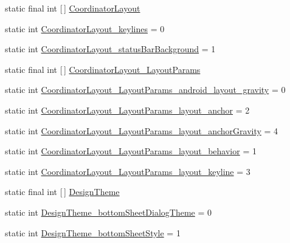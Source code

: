 \begin{DoxyCompactItemize}
\item 
static final int \mbox{[}$\,$\mbox{]} \hyperlink{classandroid_1_1support_1_1v7_1_1appcompat_1_1R_1_1styleable_a36909bd71e5ee18cc73ff4732b601a79}{Coordinator\+Layout}
\item 
static int \hyperlink{classandroid_1_1support_1_1v7_1_1appcompat_1_1R_1_1styleable_ade8ef8741049ad76bd5e90b20b187b41}{Coordinator\+Layout\+\_\+keylines} = 0
\item 
static int \hyperlink{classandroid_1_1support_1_1v7_1_1appcompat_1_1R_1_1styleable_a3cac0ac0b4683f1615bfd53649866096}{Coordinator\+Layout\+\_\+status\+Bar\+Background} = 1
\item 
static final int \mbox{[}$\,$\mbox{]} \hyperlink{classandroid_1_1support_1_1v7_1_1appcompat_1_1R_1_1styleable_aa327c121de57ab2e57c054fff5f5c980}{Coordinator\+Layout\+\_\+\+Layout\+Params}
\item 
static int \hyperlink{classandroid_1_1support_1_1v7_1_1appcompat_1_1R_1_1styleable_a2bbafef211aa759215c44685dec3bdfb}{Coordinator\+Layout\+\_\+\+Layout\+Params\+\_\+android\+\_\+layout\+\_\+gravity} = 0
\item 
static int \hyperlink{classandroid_1_1support_1_1v7_1_1appcompat_1_1R_1_1styleable_a0326fdc342fc459e0f22e865f9bafa9b}{Coordinator\+Layout\+\_\+\+Layout\+Params\+\_\+layout\+\_\+anchor} = 2
\item 
static int \hyperlink{classandroid_1_1support_1_1v7_1_1appcompat_1_1R_1_1styleable_ac5930c177fccf3156cc93d585d9e2e9c}{Coordinator\+Layout\+\_\+\+Layout\+Params\+\_\+layout\+\_\+anchor\+Gravity} = 4
\item 
static int \hyperlink{classandroid_1_1support_1_1v7_1_1appcompat_1_1R_1_1styleable_a3c5485968079da7140d1094aeaed49d7}{Coordinator\+Layout\+\_\+\+Layout\+Params\+\_\+layout\+\_\+behavior} = 1
\item 
static int \hyperlink{classandroid_1_1support_1_1v7_1_1appcompat_1_1R_1_1styleable_a71b92f33ca3d04c4ead0d908659739bf}{Coordinator\+Layout\+\_\+\+Layout\+Params\+\_\+layout\+\_\+keyline} = 3
\item 
static final int \mbox{[}$\,$\mbox{]} \hyperlink{classandroid_1_1support_1_1v7_1_1appcompat_1_1R_1_1styleable_aff3ce11bdf266828d90b9a386168c4b0}{Design\+Theme}
\item 
static int \hyperlink{classandroid_1_1support_1_1v7_1_1appcompat_1_1R_1_1styleable_aae7d45822d51ff4f85632d80246224aa}{Design\+Theme\+\_\+bottom\+Sheet\+Dialog\+Theme} = 0
\item 
static int \hyperlink{classandroid_1_1support_1_1v7_1_1appcompat_1_1R_1_1styleable_a31ceb2d562b5ab39daae25884437ad4c}{Design\+Theme\+\_\+bottom\+Sheet\+Style} = 1

\end{DoxyCompactItemize}
